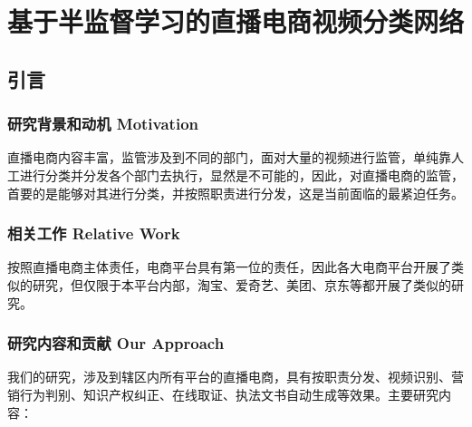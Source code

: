 \chapter{基于半监督学习的直播电商视频分类网络}\label{chap:One}

\section{引言}
\subsection{研究背景和动机 Motivation}
直播电商内容丰富，监管涉及到不同的部门，面对大量的视频进行监管，单纯靠人工进行分类并分发各个部门去执行，显然是不可能的，因此，对直播电商的监管，首要的是能够对其进行分类，并按照职责进行分发，这是当前面临的最紧迫任务。

\subsection{相关工作 Relative Work}
按照直播电商主体责任，电商平台具有第一位的责任，因此各大电商平台开展了类似的研究，但仅限于本平台内部，淘宝、爱奇艺、美团、京东等都开展了类似的研究。

\subsection{研究内容和贡献 Our Approach}
我们的研究，涉及到辖区内所有平台的直播电商，具有按职责分发、视频识别、营销行为判别、知识产权纠正、在线取证、执法文书自动生成等效果。主要研究内容：

